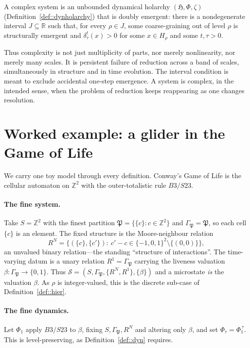 \documentclass[runningheads]{llncs}
\newcommand{\R}{\mathbb{R}}
\begin{document}
\begin{definition}\label{def::complex}
A complex system is an unbounded dynamical holarchy $(\mathfrak H,\Phi,\zeta)$ (Definition~\ref{def::dynholarchy}) that is doubly emergent: there is a nondegenerate interval $J\subseteq\R$ such that, for every $\rho\in J$, some coarse-graining out of level $\rho$ is structurally emergent and $\delta^t_\tau(x)>0$ for some $x\in H_\rho$ and some $t,\tau>0$.
\end{definition}

Thus complexity is not just multiplicity of parts, nor merely nonlinearity, nor merely many scales. It is persistent failure of reduction across a band of scales, simultaneously in structure and in time evolution. The interval condition is meant to exclude accidental one-step emergence. A system is complex, in the intended sense, when the problem of reduction keeps reappearing as one changes resolution.

\section{Worked example: a glider in the Game of Life}\label{sec::gol}

We carry one toy model through every definition. Conway's Game of Life \cite{Gardner1970} is the cellular automaton on $\mathbb Z^2$ with the outer-totalistic rule $B3/S23$.

\paragraph{The fine system.} Take $S=\mathbb Z^2$ with the finest partition $\mathfrak P=\{\{c\}:c\in\mathbb Z^2\}$ and $\Gamma_{\mathfrak P}=\mathfrak P$, so each cell $\{c\}$ is an element. The fixed structure is the Moore-neighbour relation
\[
R^{N}=\{(\{c\},\{c'\}):\ c'-c\in\{-1,0,1\}^2\setminus\{(0,0)\}\},
\]
an unvalued binary relation---the standing ``structure of interactions''. The time-varying datum is a unary relation $R^{1}=\Gamma_{\mathfrak P}$ carrying the liveness valuation $\beta:\Gamma_{\mathfrak P}\to\{0,1\}$. Thus $\mathcal S=(S,\Gamma_{\mathfrak P},\{R^{N},R^{1}\},\{\beta\})$ and a microstate \emph{is} the valuation $\beta$. As $\rho$ is integer-valued, this is the discrete sub-case of Definition~\ref{def::hier}.

\paragraph{The fine dynamics.} Let $\Phi_1$ apply $B3/S23$ to $\beta$, fixing $S,\Gamma_{\mathfrak P},R^{N}$ and altering only $\beta$, and set $\Phi_\tau=\Phi_1^{\,\tau}$. This is level-preserving, as Definition~\ref{def::dyn} requires.
\end{document}
